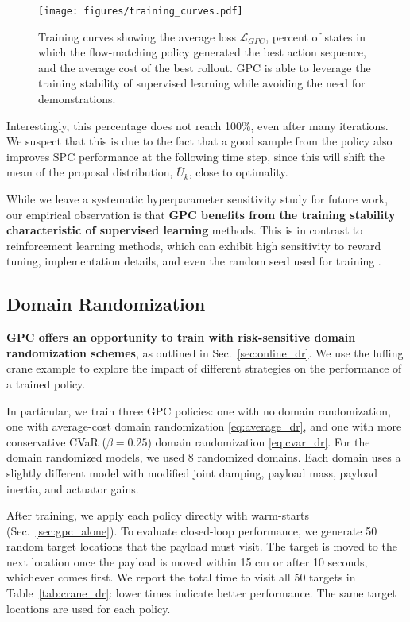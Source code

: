 \documentclass[letterpaper, 10 pt]{ieeeconf}
\begin{document}
\begin{figure*}
    \centering
    \texttt{[image: figures/training\_curves.pdf]}
    \caption{Training curves showing the average loss $\mathcal{L}_{GPC}$, percent of states in which the flow-matching policy generated the best action sequence, and the average cost of the best rollout. GPC is able to leverage the training stability of supervised learning while avoiding the need for demonstrations.}
    \label{fig:training_curves}
\end{figure*}

Interestingly, this percentage does not reach 100\%, even after many iterations. We suspect that this is due to the fact that a good sample from the policy also improves SPC performance at the following time step, since this will shift the mean of the proposal distribution, $\bar{U}_k$, close to optimality. 

While we leave a systematic hyperparameter sensitivity study for future work, our empirical observation is that \textbf{GPC benefits from the training stability characteristic of supervised learning} methods. This is in contrast to reinforcement learning methods, which can exhibit high sensitivity to reward tuning, implementation details, and even the random seed used for training \cite{engstrom2019implementation, andrychowicz2020matters}. 

\subsection{Domain Randomization}\label{sec:domain_randomization}

\textbf{GPC offers an opportunity to train with risk-sensitive domain randomization schemes}, as outlined in Sec.~\ref{sec:online_dr}. We use the luffing crane example to explore the impact of different strategies on the performance of a trained policy. 

In particular, we train three GPC policies: one with no domain randomization, one with average-cost domain randomization \eqref{eq:average_dr}, and one with more conservative CVaR ($\beta = 0.25$) domain randomization \eqref{eq:cvar_dr}. For the domain randomized models, we used 8 randomized domains. Each domain uses a slightly different model with modified joint damping, payload mass, payload inertia, and actuator gains.

After training, we apply each policy directly with warm-starts (Sec.~\ref{sec:gpc_alone}). To evaluate closed-loop performance, we generate 50 random target locations that the payload must visit. The target is moved to the next location once the payload is moved within 15 cm or after 10 seconds, whichever comes first. We report the total time to visit all 50 targets in Table~\ref{tab:crane_dr}: lower times indicate better performance. The same target locations are used for each policy.
\end{document}
